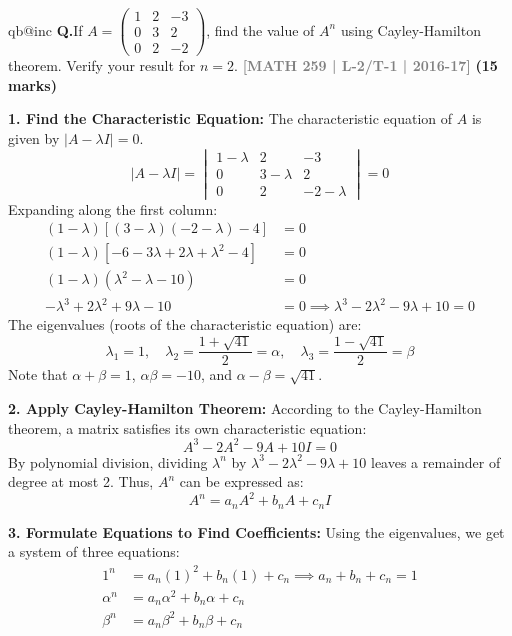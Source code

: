 \documentclass[12pt,a3paper]{article}
\makeatletter
\newcommand{\yr}[1]{\hfill\textcolor{gray}{\small\textbf{[#1]}}}
\newcommand{\mk}[1]{\textcolor{orange!70!black}{\small\textbf{(#1 marks)}}}
\newcounter{qnum}
\newcommand{\Q}[1]{%
  \csname qb@inc\endcsname
  \needspace{4\baselineskip}
  \refstepcounter{qnum}
  \vspace{6pt}
  \noindent\textbf{Q\theqnum.}\enspace #1\par
}
\makeatother
\begin{document}
\Q{If $A = \begin{pmatrix} 1 & 2 & -3 \\ 0 & 3 & 2 \\ 0 & 2 & -2 \end{pmatrix}$, find the value of $A^n$ using Cayley-Hamilton theorem. Verify your result for $n = 2$.
\yr{MATH 259 | L-2/T-1 | 2016-17} \mk{15}}

\begin{tcolorbox}[enhanced,breakable,
  colback=cE!4,colframe=cE,boxrule=0.8pt,arc=5pt,
  title={\textbf{Answer --- Finding $A^n$ via Cayley-Hamilton Theorem}},
  fonttitle=\bfseries\color{white},colbacktitle=cE]

\textbf{1. Find the Characteristic Equation:}
The characteristic equation of $A$ is given by $|A - \lambda I| = 0$.
\[
|A - \lambda I| = \begin{vmatrix} 
1-\lambda & 2 & -3 \\ 
0 & 3-\lambda & 2 \\ 
0 & 2 & -2-\lambda 
\end{vmatrix} = 0
\]
Expanding along the first column:
\begin{align*}
(1-\lambda) [ (3-\lambda)(-2-\lambda) - 4 ] &= 0 \\
(1-\lambda) [ -6 - 3\lambda + 2\lambda + \lambda^2 - 4 ] &= 0 \\
(1-\lambda) ( \lambda^2 - \lambda - 10 ) &= 0 \\
-\lambda^3 + 2\lambda^2 + 9\lambda - 10 &= 0 \implies \lambda^3 - 2\lambda^2 - 9\lambda + 10 = 0
\end{align*}
The eigenvalues (roots of the characteristic equation) are:
\[
\lambda_1 = 1, \quad \lambda_2 = \frac{1+\sqrt{41}}{2} = \alpha, \quad \lambda_3 = \frac{1-\sqrt{41}}{2} = \beta
\]
Note that $\alpha + \beta = 1$, $\alpha\beta = -10$, and $\alpha - \beta = \sqrt{41}$.

\vspace{0.3cm}
\textbf{2. Apply Cayley-Hamilton Theorem:}
According to the Cayley-Hamilton theorem, a matrix satisfies its own characteristic equation:
\[
A^3 - 2A^2 - 9A + 10I = 0
\]
By polynomial division, dividing $\lambda^n$ by $\lambda^3 - 2\lambda^2 - 9\lambda + 10$ leaves a remainder of degree at most 2. Thus, $A^n$ can be expressed as:
\[
A^n = a_n A^2 + b_n A + c_n I
\]

\textbf{3. Formulate Equations to Find Coefficients:}
Using the eigenvalues, we get a system of three equations:
\begin{align}
1^n &= a_n(1)^2 + b_n(1) + c_n \implies a_n + b_n + c_n = 1 \\
\alpha^n &= a_n\alpha^2 + b_n\alpha + c_n \\
\beta^n &= a_n\beta^2 + b_n\beta + c_n
\end{align}


\end{tcolorbox}
\end{document}
